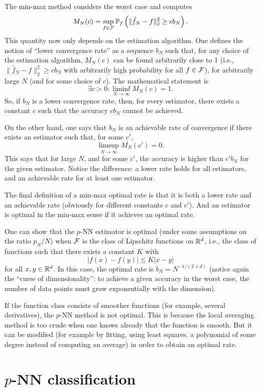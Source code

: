The min-max method considers the worst case and computes
$$
M_N(c) = \sup_{f\in {\mathcal F}}  \bm{\mathbb P}_f\left(\|\hat f_N - f\|^2_2 \geq c b_N\right).
$$
This quantity now only depends on the estimation algorithm. One defines the notion of 
``lower convergence rate'' as a  sequence $b_N$
such that, for any choice of the estimation algorithm,  $M_N(c)$ can be found arbitrarily close to 1 (i.e., $\|\hat
f_N - f\|^2_2 \geq c b_N$ with arbitrarily high probability for all
$f\in {\mathcal F}$), for
arbitrarily large $N$ (and for some choice of $c$). The mathematical
statement is
$$
\exists c > 0: \liminf_{N\to\infty} M_N(c) = 1.
$$
So, if $b_N$ is a lower convergence rate, then, for every estimator,
there exists a constant
$c$ such that the accuracy $cb_N$ cannot be achieved. 

On the other hand, one says that $b_N$ is an achievable rate of
convergence if there exists an estimator such that, for some $c'$,
$$
\limsup_{N\to\infty} M_N(c') = 0.
$$
This says that for large $N$, and for some $c'$, the accuracy is
higher than $c'b_N$ for the given estimator. Notice the difference: a
lower rate holds for all estimators, and an achievable rate for at
least one estimator.

The final definition of a min-max optimal rate is that it is both a
lower rate and an achievable rate (obviously for different constants
$c$ and $c'$). And an estimator is optimal in the min-max sense if it
achieves an optimal rate.


One can show that the $p$-NN estimator is optimal (under some assumptions
on the ratio $p_N/N$) when ${\mathcal F}$ is the class
of Lipschitz functions on ${\mathbb{R}}^d$, i.e., the class of functions such that
there exists a constant $K$ with
$$
|f(x) - f(y)|\leq K |x-y|
$$
for all $x,y\in{\mathbb{R}}^d$. In this case, the optimal rate is $b_N =
N^{-1/(2+d)}$ (notice again the ``curse of dimensionality'': to achieve
a given accuracy in the worst case, the number of data points must grow exponentially with
the  dimension).

If the function class consists of smoother functions (for example,
several derivatives), the $p$-NN method is not optimal. This is
because the local averaging method is too crude when one knows already
that the function is smooth. But it can be modified (for example by
fitting, using least squares, a polynomial of some degree instead of computing an average)
in order to obtain an optimal rate.

\section{$p$-NN classification}

